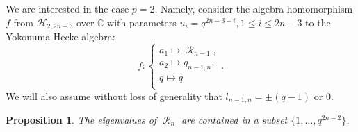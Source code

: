 \documentclass[12pt,reqno]{amsart}
\newtheorem{prop}[thm]{Proposition}
\theoremstyle{definition}
\theoremstyle{remark}
\numberwithin{equation}{section}
\newcommand{\CC}{\mathbb{C}}
\DeclareMathOperator{\R}{\mathcal{R}}
\begin{document}
We are interested in the case $p=2$. Namely, consider the algebra homomorphism $f$ from $\mathcal{H}_{2,2n-3}$ over $\CC$ with parameters $u_i=q^{2n-3-i}, 1\le i \le 2n-3$ to the Yokonuma-Hecke algebra:
\[
f: \begin{cases}
    a_1 \mapsto \R_{n-1},\\
    a_2 \mapsto g_{n-1,n},\\
    q \mapsto q\\
\end{cases}.
\]
We will also assume without loss of generality that $l_{n-1,n}=\pm (q-1)$ or $0$.\\

\begin{prop}\label{Ariki_Koike_Yok}
    The eigenvalues of $\R_n$ are contained in a subset $\{1,\dots, q^{2n-2}\}$.
\end{prop}
\end{document}
